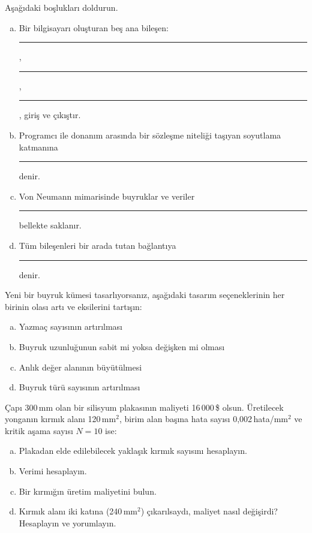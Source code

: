 \begin{alistirma}[\kolay]
Aşağıdaki boşlukları doldurun.
\begin{enumerate}[(a)]
    \item Bir bilgisayarı oluşturan beş ana bileşen: \rule{2cm}{0.4pt}, \rule{2cm}{0.4pt}, \rule{2cm}{0.4pt}, giriş ve çıkıştır.
    \item Programcı ile donanım arasında bir sözleşme niteliği taşıyan soyutlama katmanına \rule{3cm}{0.4pt} denir.
    \item Von Neumann mimarisinde buyruklar ve veriler \rule{3cm}{0.4pt} bellekte saklanır.
    \item Tüm bileşenleri bir arada tutan bağlantıya \rule{2cm}{0.4pt} denir.
\end{enumerate}
\end{alistirma}

\begin{alistirma}[\zor]
Yeni bir buyruk kümesi tasarlıyorsanız, aşağıdaki tasarım seçeneklerinin her birinin olası artı ve eksilerini tartışın:
\begin{enumerate}[(a)]
    \item Yazmaç sayısının artırılması
    \item Buyruk uzunluğunun sabit mi yoksa değişken mi olması
    \item Anlık değer alanının büyütülmesi
    \item Buyruk türü sayısının artırılması
\end{enumerate}
\end{alistirma}


\begin{alistirma}[\zor]
Çapı 300\,mm olan bir silisyum plakasının maliyeti 16\,000\,\$ olsun. Üretilecek yonganın kırmık alanı 120\,mm$^2$, birim alan başına hata sayısı 0{,}002\,hata/mm$^2$ ve kritik aşama sayısı $N = 10$ ise:
\begin{enumerate}[(a)]
    \item Plakadan elde edilebilecek yaklaşık kırmık sayısını hesaplayın.
    \item Verimi hesaplayın.
    \item Bir kırmığın üretim maliyetini bulun.
    \item Kırmık alanı iki katına (240\,mm$^2$) çıkarılsaydı, maliyet nasıl değişirdi? Hesaplayın ve yorumlayın.
\end{enumerate}
\end{alistirma}

